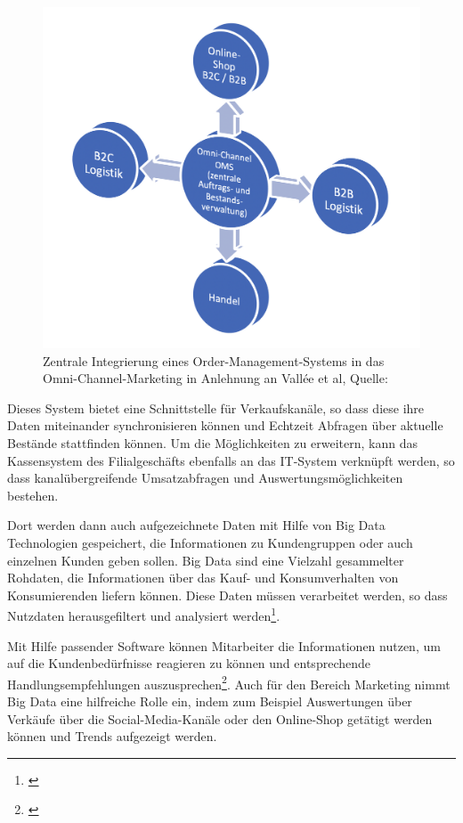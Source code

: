 \begin{figure}[!ht]
    \centering
    \includegraphics[width=1\textwidth,angle=0]{src/abbildungen/OMS-System.png}
    \caption[Quelle: Omni-Channel im Handel, 2018]{Zentrale Integrierung eines Order-Management-Systems in das Omni-Channel-Marketing in Anlehnung an Vallée et al, Quelle: \autocite {Vallee2018}}
   \label{fig: oms_system}
   \end{figure}

Dieses System bietet eine Schnittstelle für Verkaufskanäle, so dass diese ihre Daten miteinander synchronisieren können und Echtzeit Abfragen über aktuelle Bestände stattfinden können. Um die Möglichkeiten zu erweitern, kann das Kassensystem des Filialgeschäfts ebenfalls an das IT-System verknüpft werden, so dass kanalübergreifende Umsatzabfragen und Auswertungsmöglichkeiten bestehen.
\newline

Dort werden dann auch aufgezeichnete Daten mit Hilfe von Big Data Technologien gespeichert, die Informationen zu Kundengruppen oder auch einzelnen Kunden geben sollen. Big Data sind eine Vielzahl gesammelter Rohdaten, die Informationen über das Kauf- und Konsumverhalten von Konsumierenden liefern können. Diese Daten müssen verarbeitet werden, so dass Nutzdaten herausgefiltert und analysiert werden\footnote{\autocite [S. 6] {Fasel2016}}.
\newline

Mit Hilfe passender Software können Mitarbeiter die Informationen nutzen, um auf die Kundenbedürfnisse reagieren zu können und entsprechende Handlungsempfehlungen auszusprechen\footnote{\autocite [S. 28] {Vallee2018}}. Auch für den Bereich Marketing nimmt Big Data eine hilfreiche Rolle ein, indem zum Beispiel Auswertungen über Verkäufe über die Social-Media-Kanäle oder den Online-Shop getätigt werden können und Trends aufgezeigt werden.
\newline

